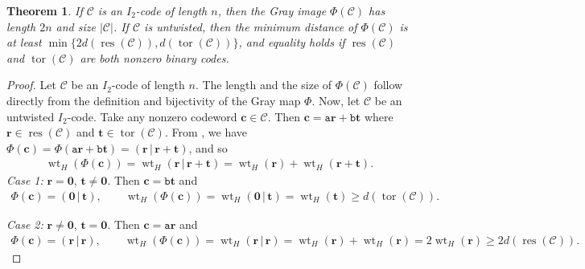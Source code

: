 \documentclass[12pt]{article}
\newtheorem{theorem}{Theorem}[section]
\theoremstyle{definition}
\theoremstyle{plain}
\newcommand{\Blue}[1]{{ \color{blue} #1}}
\begin{document}
\begin{theorem}  \label{thm:parameters of Gray image}
If $\mathcal{C}$ is an $I_2$-code of length $n$, then the Gray image $\Phi (\mathcal{C})$ has length $2n$ and size $|\mathcal{C}|$. If $\mathcal{C}$ is untwisted, then the minimum distance of $\Phi ( \mathcal{C} )$ is at least $\min\{  2 d (\operatorname{res} ( \mathcal{C} ) )  ,  d (\operatorname{tor} ( \mathcal{C} ) )  \}$, and equality holds if $\operatorname{res} ( \mathcal{C} )$ and $\operatorname{tor} ( \mathcal{C} )$ are both nonzero binary codes.
\end{theorem}



\begin{proof}
Let $ \mathcal{C}$ be an $I_2$-code of length $n$. The length and the size of $\Phi ( \mathcal{C})$ follow directly from the definition and bijectivity of the Gray map $\Phi$. Now, let $\mathcal{C}$ be an untwisted $I_2$-code. Take any nonzero codeword $ \mathbf{c}  \in \mathcal{C}$. Then $ \mathbf{c} =   \mathtt{a}  \mathbf{r}  +  \mathtt{b}  \mathbf{t} $ where $ \mathbf{r}  \in  \operatorname{res} (\mathcal{C}) $ and $ \mathbf{t}  \in \operatorname{tor} (\mathcal{C}) $. From , we have $\Phi( \mathbf{c} ) = \Phi( \mathtt{a}  \mathbf{r}  +  \mathtt{b}  \mathbf{t} ) = ( \mathbf{r} \, | \, \mathbf{r} + \mathbf{t} )$, and so
\begin{align*}
\operatorname{wt}_H ( \Phi( \mathbf{c} ) ) = \operatorname{wt}_H ( \mathbf{r} \, | \, \mathbf{r} + \mathbf{t} ) =  \operatorname{wt}_H ( \mathbf{r} ) + \operatorname{wt}_H ( \mathbf{r} + \mathbf{t} )  .
\end{align*}
\emph{Case 1:} $ \mathbf{r} = \mathbf{0}$, $ \mathbf{t} \neq \mathbf{0}$.
Then $ \mathbf{c} =  \mathtt{b} \mathbf{t} $ and
\begin{align*}
\Phi( \mathbf{c} ) = ( \mathbf{0} \, | \, \mathbf{t}  ),
\qquad
\operatorname{wt}_H ( \Phi ( \mathbf{c} ) )  = \operatorname{wt}_H ( \mathbf{0} \, | \, \mathbf{t}  ) = \operatorname{wt}_H ( \mathbf{t} ) \ge d ( \operatorname{tor} (\mathcal{C}) )  .
\end{align*}


\noindent  \emph{Case 2:} $ \mathbf{r} \neq \mathbf{0} $, $ \mathbf{t} = \mathbf{0} $.
Then $ \mathbf{c} =  \mathtt{a}  \mathbf{r} $ and
\begin{align*}
\Phi ( \mathbf{c} ) = ( \mathbf{r} \, | \, \mathbf{r} ),
\qquad
\operatorname{wt}_H ( \Phi ( \mathbf{c} ) )  =  \operatorname{wt}_H ( \mathbf{r} \, | \, \mathbf{r} ) = \operatorname{wt}_H ( \mathbf{r} ) + \operatorname{wt}_H ( \mathbf{r} ) = 2  \operatorname{wt}_H ( \mathbf{r} ) \ge 2 d( \operatorname{res} (\mathcal{C}) ) .
\end{align*}




\end{proof}
\end{document}

